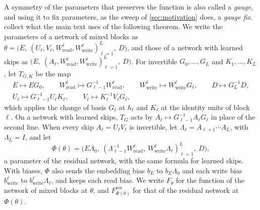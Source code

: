\documentclass[10pt]{article}
\theoremstyle{definition}
\theoremstyle{remark}
\newcommand{\Wread}{W_{\mathrm{read}}}
\newcommand{\Wwrite}{W_{\mathrm{write}}}
\begin{document}
A symmetry of the parameters that preserves the function is also called a \emph{gauge}, and using it to fix parameters, as the sweep of \cref{sec:motivation} does, a \emph{gauge fix}.  collect what the main text uses of the following theorem. We write the parameters of a network of mixed blocks as $\theta = \big(E,\ (U_\ell, V_\ell, \Wread^{\ell}, \Wwrite^{\ell})_{\ell=1}^{L},\ D\big)$, and those of a network with learned skips as $\big(E,\ (A_\ell, \Wread^{\ell}, \Wwrite^{\ell})_{\ell=1}^{L},\ D\big)$. For invertible $G_0, \dots, G_L$ and $K_1, \dots, K_L$, let $T_{G,K}$ be the map
\begin{equation}\label{eq:gaugeact}
\begin{gathered}
E \mapsto EG_0, \qquad \Wread^{\ell} \mapsto G_{\ell-1}^{-1}\Wread^{\ell}, \qquad \Wwrite^{\ell} \mapsto \Wwrite^{\ell}G_\ell, \qquad D \mapsto G_L^{-1}D,\\
U_\ell \mapsto G_{\ell-1}^{-1}U_\ell K_\ell, \qquad V_\ell \mapsto K_\ell^{-1}V_\ell G_\ell,
\end{gathered}
\end{equation}
which applies the change of basis $G_\ell$ at $h_\ell$ and $K_\ell$ at the identity units of block $\ell$. On a network with learned skips, $T_G$ acts by $A_\ell \mapsto G_{\ell-1}^{-1}A_\ell G_\ell$ in place of the second line. When every skip $A_\ell = U_\ell V_\ell$ is invertible, let $\Lambda_\ell = A_{\ell+1}\cdots A_L$, with $\Lambda_L = I$, and let
\begin{equation}\label{eq:gaugemap}
\Phi(\theta) = \big(E\Lambda_0,\ (\Lambda_{\ell-1}^{-1}\Wread^{\ell},\ \Wwrite^{\ell}\Lambda_\ell)_{\ell=1}^{L},\ D\big),
\end{equation}
a parameter of the residual network, with the same formula for learned skips. With biases, $\Phi$ also sends the embedding bias $b_E$ to $b_E\Lambda_0$ and each write bias $b^{\ell}_{\mathrm{write}}$ to $b^{\ell}_{\mathrm{write}}\Lambda_\ell$, and keeps each read bias. We write $F_\theta$ for the function of the network of mixed blocks at $\theta$, and $F^{\mathrm{res}}_{\Phi(\theta)}$ for that of the residual network at $\Phi(\theta)$.
\end{document}
